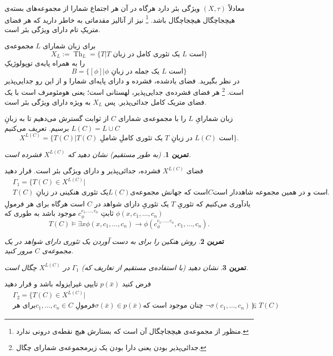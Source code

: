 \documentclass[12pt,a4paper]{report}
\theoremstyle{colorhead}
\newtheorem{tam}{تمرین}
\DeclareMathOperator{\Th}{Th}
\begin{document}
معادلاً 
$(X,\tau)$
ويژگی بئر دارد هرگاه در آن هر اجتماع شمارا از مجموعه‌های بسته‌ی
	هیچجاچگال
هیچجاچگال باشد.
\footnote{منظور از مجموعه‌ی هیچجاچگال  آن است که بستارش هیچ نقطه‌ی درونی ندارد.}
نیز 
از آنالیز مقدماتی به خاطر دارید که هر فضای متریکِ تام دارای ویژگی
بئر است. 
\par 
برای زبان شمارای 
$L$
مجموعه‌ی
\[
X_L:=\Th_L=\{T|\text{$T$ یک تئوری کامل در زبان $L$ است}\}
\]
را
به همراه پایه‌ی توپولوژیکِ
\[
B=\{[\phi]|\text{$\phi$ یک جمله در زبانِ $L$ است}\}
\]
در نظر بگیرید. فضای یادشده، فشرده و دارای پایه‌ای شمارا و از این رو جدایی‌پذیر
است. 
\footnote{جدائی‌پذیر بودن یعنی دارا بودن یک زیرمجموعه‌ی شمارای چگال.}
هر فضای فشرده‌ی جدایی‌پذیر، لهستانی
است؛ یعنی هومئومرف است با یک فضای متریک کامل جدائی‌پذیر. پس 
$X_L$
به ویژه دارای ویژگی بئر است. 
\par 
زبان شمارایِ
$L$
را با مجموعه‌ی شمارای
$C$
از ثوابت گسترش می‌دهیم تا به زبانِ
\mbox{$L(C)=L\cup C$}
برسیم.  تعریف می‌کنیم
\[ X^{L(C)}=\{T(C)|\text{$T(C)$ یک تئوری کاملِ  شاملِ $T$ در زبانِ $L(C)$ است}\}.\]
\begin{tam}
(به طور مستقیم)
نشان دهید که
$X^{L(C)}$
فشرده است.
\end{tam}
فضای
$X^{L(C)}$
فشرده، جدائی‌پذیر  و دارای ویژگی بئر است. قرار دهید
\begin{align*}
& \Gamma_1=\{T(C)\in X^{L(C)}|
\\
&
\text{$T(C)$ یک تئوری هنکینی در زبانِ
$L(C)$
است که جهانش مجموعه‌ی
$C$
است و در همین مجموعه‌ 
شاهددار است.
}
\end{align*}
یادآوری می‌کنیم که تئوریِ
$T$
یک تئوریِ دارای شواهد در
$C$
است هرگاه برای هر فرمولِ
$\phi(x,c_1,\ldots,c_n)$
ثابتِ
$c_\phi^{c_1,\ldots,c_n}$
موجود باشد به طوری که 
\[
T(C)\models \exists x\phi(x,c_1,\ldots,c_n)\to \phi(c_\phi^{c_1,\ldots,c_n},c_1,\ldots,c_n).
\]
\begin{tam}
روش هنکین را برای به دست آوردن یک تئوری دارای شواهد در یک مجموعه‌ی
$C$
مرور کنید.
\end{tam}
\begin{tam}
نشان دهید (با استفاده‌ی مستقیم از تعاریف که)
$\Gamma_1$
در
$X^{L(C)}$
چگال است.
\end{tam}
فرض کنید
$p(\bar{x})$
تایپی غیرایزوله باشد و قرار دهید
\begin{align*}
& \Gamma_2=\{T(C)\in X^{L(C)}|
\\
&  \text{برای هر
$c_1,\ldots,c_n\in C$ فرمولِ
$\sigma(\bar{x})\in p(\bar{x})$
چنان موجود است که 
$\neg \sigma(c_1,\ldots,c_n)\in T(C)$
}\}.
\end{align*}
\end{document}

